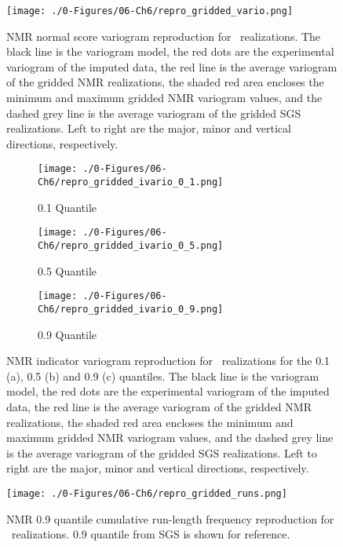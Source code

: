 \begin{figure}[htb!]
    \centering
    \texttt{[image: ./0-Figures/06-Ch6/repro\_gridded\_vario.png]}
    \caption{\gls{NMR} normal score variogram reproduction for \csnreals \ realizations. The black line is the variogram model, the red dots are the experimental variogram of the imputed data, the red line is the average variogram of the gridded \gls{NMR} realizations, the shaded red area encloses the minimum and maximum gridded \gls{NMR} variogram values, and the dashed grey line is the average variogram of the gridded \gls{SGS} realizations. Left to right are the major, minor and vertical directions, respectively.}
    \label{fig:repro_gridded_vario}
\end{figure}

\begin{figure}
    \begin{subfigure}{1.0\textwidth}
        \centering
        \texttt{[image: ./0-Figures/06-Ch6/repro\_gridded\_ivario\_0\_1.png]}
        \caption{0.1 Quantile}
    \end{subfigure}
    \begin{subfigure}{1.0\textwidth}
        \centering
        \texttt{[image: ./0-Figures/06-Ch6/repro\_gridded\_ivario\_0\_5.png]}
        \caption{0.5 Quantile}
    \end{subfigure}
    \begin{subfigure}{1.0\textwidth}
        \centering
        \texttt{[image: ./0-Figures/06-Ch6/repro\_gridded\_ivario\_0\_9.png]}
        \caption{0.9 Quantile}
    \end{subfigure}
    \caption{\gls{NMR} indicator variogram reproduction for \csnreals \ realizations for the 0.1 (a), 0.5 (b) and 0.9 (c) quantiles. The black line is the variogram model, the red dots are the experimental variogram of the imputed data, the red line is the average variogram of the gridded \gls{NMR} realizations, the shaded red area encloses the minimum and maximum gridded \gls{NMR} variogram values, and the dashed grey line is the average variogram of the gridded \gls{SGS} realizations. Left to right are the major, minor and vertical directions, respectively.}
    \label{fig:repro_gridded_ivario}
\end{figure}

\begin{figure}[htb!]
    \centering
    \texttt{[image: ./0-Figures/06-Ch6/repro\_gridded\_runs.png]}
    \caption{\gls{NMR} 0.9 quantile cumulative run-length frequency reproduction for \csnreals \ realizations. 0.9 quantile from \gls{SGS} is shown for reference.}
    \label{fig:repro_gridded_runs}
\end{figure}

